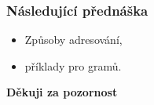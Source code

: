   \begin{frame}
    \frametitle{Následující přednáška}
		
		\begin{itemize}
			\item Způsoby adresování,
			\item příklady pro gramů.
		\end{itemize}
		
		\begin{center}
			\textbf{Děkuji za pozornost}
		\end{center}
		
	\end{frame}